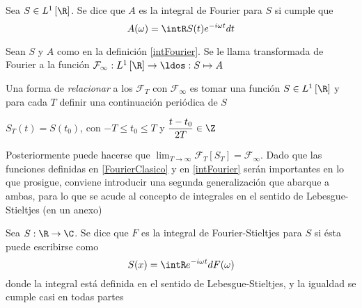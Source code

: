 \begin{definicion}
Sea $S \in L^{1}\left[\R\right]$. Se dice que $A$ es la integral de Fourier para $S$ si cumple que
\begin{equation*}
A(\omega) = \intR S(t) e^{- i \omega t} dt
\end{equation*}
\label{intFourier}
\end{definicion}

\begin{definicion}
Sean $S$ y $A$ como en la definición \ref{intFourier}. Se le llama transformada de Fourier a la
función $\mathcal{F}_\infty : L^{1}\left[\R\right] \rightarrow \ldos : S \mapsto A$
\end{definicion}

Una forma de \textit{relacionar} a los $\mathcal{F}_T$ con $\mathcal{F}_\infty$ es tomar una
función $S \in L^{1}\left[\R\right]$ y para cada $T$ definir una continuación periódica de $S$
\begin{center}
$\displaystyle S_T(t) = S(t_0) $, 
con $\displaystyle -T\leq t_0 \leq T$ y $\displaystyle \frac{t-t_0}{2T} \in \Z$
\end{center} 
%
Posteriormente puede hacerse que
$\lim_{T\rightarrow \infty} \mathcal{F}_T[S_T] = \mathcal{F}_{\infty}$.
%
Dado que las funciones definidas en \ref{FourierClasico} y en \ref{intFourier} serán importantes 
en lo que prosigue, conviene introducir una segunda generalización que abarque a ambas, para lo que
se acude al concepto de integrales en el sentido de Lebesgue-Stieltjes (en un anexo)

\begin{definicion}
Sea $S: \R\rightarrow \C$. Se dice que $F$ es la integral de Fourier-Stieltjes para $S$ si ésta 
puede escribirse como
\begin{equation*}
S(x) = \intR e^{- i \omega t} dF(\omega)
\end{equation*}
donde la integral está definida en el sentido de Lebesgue-Stieltjes, y la igualdad se cumple
casi en todas partes
\label{intFourierStieltjes}
\end{definicion}

